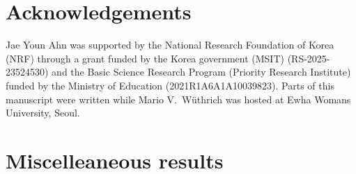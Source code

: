 \documentclass[11pt,authoryear]{elsarticle}
\theoremstyle{nopunct}
\numberwithin{equation}{section}
\begin{document}
%
%
%




\section*{Acknowledgements}

Jae Youn Ahn was supported by the National Research Foundation of Korea (NRF) through a grant funded by the Korea government (MSIT) (RS-2025-23524530) and the Basic Science Research Program (Priority Research Institute) funded by the Ministry of Education (2021R1A6A1A10039823).
Parts of this manuscript were written while Mario V.~W\"uthrich was hosted at Ewha Womans University, Seoul.









\appendix

\section{Miscelleaneous results}\label{app.1}
\end{document}
